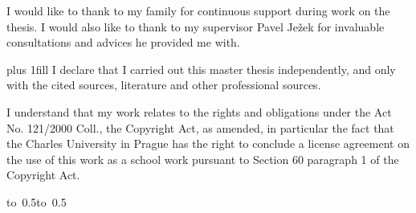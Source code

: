 \documentclass[12pt,a4paper]{report}
\begin{document}
\newpage
\noindent 
I would like to thank to my family for continuous support during work on the thesis. I would also like to thank to my supervisor Pavel Ježek for invaluable consultations and advices he provided me with.



\newpage

\vglue 0pt plus 1fill
\noindent
I declare that I carried out this master thesis independently, and only with the cited sources, literature and other professional sources.

\medskip\noindent
I understand that my work relates to the rights and obligations under the Act No. 121/2000 Coll., the Copyright Act, as amended, in particular the fact that the Charles University in Prague has the right to conclude a license agreement on the use of this work as a school work pursuant to Section 60 paragraph 1 of the Copyright Act.

\vspace{10mm}
\hbox{\hbox to 0.5\hbox to 0.5}
\vspace{20mm}



\newpage
\end{document}
